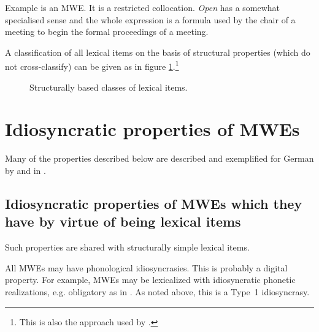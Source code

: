 \documentclass[output=paper]{langsci/langscibook}
\begin{document}
Example  is an MWE. It is a restricted collocation. \textit{Open} has a somewhat specialised sense and the whole expression is a formula used by the chair of a meeting to begin the formal proceedings of a meeting. 

A classification of all lexical items on the basis of structural properties (which do not cross-classify) can be given as in figure \ref{fig:05:01}.\footnote{   This is also the approach used by \citet{Fiedler2007}.}

\begin{figure}[h]
\centering
{}
\caption{Structurally based classes of lexical items.}
\label{fig:05:01}
\end{figure}


\section{Idiosyncratic properties of MWEs}

Many of the properties described below are described and exemplified for German by \citet{Burger2010} and in \citet{Jaki2014}.

\subsection{Idiosyncratic properties of MWEs which they have by virtue of being lexical items}

Such properties are shared with structurally simple lexical items.

All MWEs may have phonological idiosyncrasies. This is probably a digital property. For example, MWEs may be lexicalized with idiosyncratic phonetic realizations, e.g. obligatory  as in . As noted above, this is a Type~1 idiosyncrasy.
\end{document}
